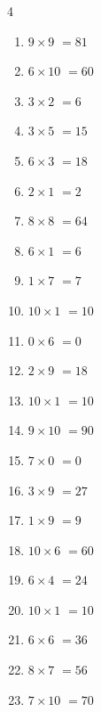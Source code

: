 \begin{multicols}{4}
\begin{enumerate}
  \item $9\times 9$
        $=81$

  \item $6\times 10$
        $=60$

  \item $3\times 2$
        $=6$

  \item $3\times 5$
        $=15$

  \item $6\times 3$
        $=18$

  \item $2\times 1$
        $=2$

  \item $8\times 8$
        $=64$

  \item $6\times 1$
        $=6$

  \item $1\times 7$
        $=7$

  \item $10\times 1$
        $=10$

  \item $0\times 6$
        $=0$

  \item $2\times 9$
        $=18$

  \item $10\times 1$
        $=10$

  \item $9\times 10$
        $=90$

  \item $7\times 0$
        $=0$

  \item $3\times 9$
        $=27$

  \item $1\times 9$
        $=9$

  \item $10\times 6$
        $=60$

  \item $6\times 4$
        $=24$

  \item $10\times 1$
        $=10$

  \item $6\times 6$
        $=36$

  \item $8\times 7$
        $=56$

  \item $7\times 10$
        $=70$


\end{enumerate}
\end{multicols}
